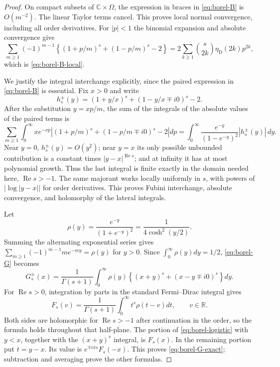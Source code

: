\documentclass[11pt,a4paper]{article}
\numberwithin{equation}{section}
\theoremstyle{definition}
\theoremstyle{remark}
\begin{document}
\begin{proof}
On compact subsets of $\mathbb C\times\Omega$, the expression in braces
in \eqref{eq:borel-B} is $O(m^{-2})$. The linear Taylor terms cancel.
This proves local normal convergence, including all order derivatives.
For $|p|<1$ the binomial expansion and absolute convergence give
\[
 \sum_{m\geq1}(-1)^{m-1}
 \left\{(1+p/m)^s+(1-p/m)^s-2\right\}
 =2\sum_{k\geq1}\binom{s}{2k}\eta_{\mathrm D}(2k)p^{2k},
\]
which is \eqref{eq:borel-B-local}.

We justify the integral interchange explicitly, since the paired
expression in \eqref{eq:borel-B} is essential. Fix $x>0$ and write
\[
 h_s^{\pm}(y)=(1+y/x)^s+(1-y/x\mp i0)^s-2.
\]
After the substitution $y=xp/m$, the sum of the integrals of the
absolute values of the paired terms is
\begin{equation}\label{eq:borel-majorant}
 \sum_{m\geq1}\int_0^\infty xe^{-xp}
 \left|(1+p/m)^s+(1-p/m\mp i0)^s-2\right|dp
 =\int_0^\infty\frac{e^{-y}}{(1-e^{-y})^2}
 |h_s^{\pm}(y)|\,dy.
\end{equation}
Near $y=0$, $h_s^{\pm}(y)=O(y^2)$; near $y=x$ its only possible
unbounded contribution is a constant times $|y-x|^{\operatorname{Re}s}$;
and at infinity it has at most polynomial growth. Thus the last integral
is finite exactly in the domain needed here, $\operatorname{Re}s>-1$.
The same majorant works locally uniformly in $s$, with powers of
$|\log|y-x||$ for order derivatives. This proves Fubini interchange,
absolute convergence, and holomorphy of the lateral integrals.

Let
\[
 \rho(y)=\frac{e^{-y}}{(1+e^{-y})^2}
        =\frac{1}{4\cosh^2(y/2)}.
\]
Summing the alternating exponential series gives
$\sum_{m\geq1}(-1)^{m-1}m e^{-my}=\rho(y)$ for $y>0$.
Since $\int_0^\infty\rho(y)dy=1/2$, \eqref{eq:borel-G} becomes
\begin{equation}\label{eq:borel-logistic}
 G_s^{\pm}(x)=\frac{1}{\Gamma(s+1)}\int_0^\infty\rho(y)
 \left\{(x+y)^s+(x-y\mp i0)^s\right\}dy.
\end{equation}
For $\operatorname{Re}s>0$, integration by parts in the standard
Fermi--Dirac integral gives
\begin{equation}\label{eq:borel-F-logistic}
 F_s(v)=\frac{1}{\Gamma(s+1)}\int_0^\infty t^s\rho(t-v)dt,
 \qquad v\in\mathbb R.
\end{equation}
Both sides are holomorphic for $\operatorname{Re}s>-1$ after continuation
in the order, so the formula holds throughout that half-plane.
The portion of \eqref{eq:borel-logistic} with $y<x$, together with the
$(x+y)^s$ integral, is $F_s(x)$. In the remaining portion put $t=y-x$.
Its value is $e^{\mp i\pi s}F_s(-x)$. This proves
\eqref{eq:borel-G-exact}; subtraction and averaging prove the other
formulas.
\end{proof}
\end{document}
